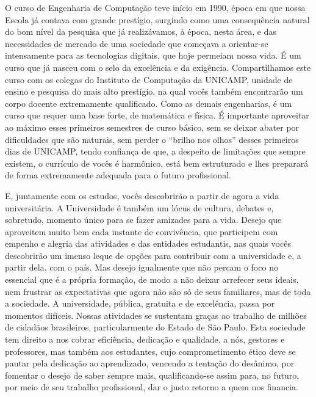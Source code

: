  O curso de Engenharia de Computação teve início em 1990, época em que nossa
 Escola já contava com grande prestígio, surgindo como uma consequência natural
 do bom nível da pesquisa que já realizávamos, à época, nesta área, e das
 necessidades de mercado de uma sociedade que começava a orientar-se
 intensamente para as tecnologias digitais, que hoje permeiam nossa vida. É um
 curso que já nasceu com o selo da excelência e da exigência. Compartilhamos
 este curso com os colegas do Instituto de Computação da UNICAMP, unidade de
 ensino e pesquisa do mais alto prestígio, na qual vocês também encontrarão um
 corpo docente extremamente qualificado. Como as demais engenharias, é um curso
 que requer uma base forte, de matemática e física. É importante aproveitar ao
 máximo esses primeiros semestres de curso básico, sem se deixar abater por
 dificuldades que são naturais, sem perder o “brilho nos olhos” desses primeiros
 dias de UNICAMP, tendo confiança de que, a despeito de limitações que sempre
 existem, o currículo de vocês é harmônico, está bem estruturado e lhes
 preparará de forma extremamente adequada para o futuro profissional.

 E, juntamente com os estudos, vocês descobrirão a partir de agora a vida
 universitária. A Universidade é também um lócus de cultura, debates e,
 sobretudo, momento único para se fazer amizades para a vida. Desejo que
 aproveitem muito bem cada instante de convivência, que participem com empenho e
 alegria das atividades e das entidades estudantis, nas quais vocês descobrirão
 um imenso leque de opções para contribuir com a universidade e, a partir dela,
 com o país. Mas desejo igualmente que não percam o foco no essencial que é a
 própria formação, de modo a não deixar arrefecer seus ideais, nem frustrar as
 expectativas que agora não são só de seus familiares, mas de toda a sociedade.
 A universidade, pública, gratuita e de excelência, passa por momentos difíceis.
 Nossas atividades se sustentam graças ao trabalho de milhões de cidadãos
 brasileiros, particularmente do Estado de São Paulo. Esta sociedade tem direito
 a nos cobrar eficiência, dedicação e qualidade, a nós, gestores e professores,
 mas também aos estudantes, cujo comprometimento ético deve se pautar pela
 dedicação ao aprendizado, vencendo a tentação do desânimo, por fomentar o
 desejo de saber sempre mais, qualificando-se assim para, no futuro, por meio de
 seu trabalho profissional, dar o justo retorno a quem nos financia.

